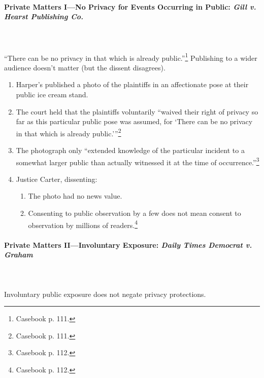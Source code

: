 \paragraph{Private Matters I---No Privacy for Events Occurring in Public: 
\emph{Gill v. Hearst Publishing Co.}}
~\\\\
``There can be no privacy in that which is already public.''\footnote{Casebook 
p. 111.} Publishing to a wider audience doesn't matter (but the dissent 
disagrees).

\begin{enumerate}
    \item Harper's published a photo of the plaintiffs in an affectionate pose 
    at their public ice cream stand.
    \item The court held that the plaintiffs voluntarily \enquote{waived their right of 
    privacy so far as this particular public pose was assumed, for 
    \enquote{There can be no privacy in that which is already 
    public.}}\footnote{Casebook p. 111.}
    \item The photograph only ``extended knowledge of the particular incident to 
    a somewhat larger public than actually witnessed it at the time of 
    occurrence.''\footnote{Casebook p. 112.}
    \item Justice Carter, dissenting:
    \begin{enumerate}
        \item The photo had no news value.
        \item Consenting to public observation by a few does not mean consent to 
        observation by millions of readers.\footnote{Casebook p. 112.}
    \end{enumerate}
\end{enumerate}

\paragraph{Private Matters II---Involuntary Exposure: \emph{Daily Times Democrat 
v. Graham}}
~\\\\
Involuntary public exposure does not negate privacy protections. 


